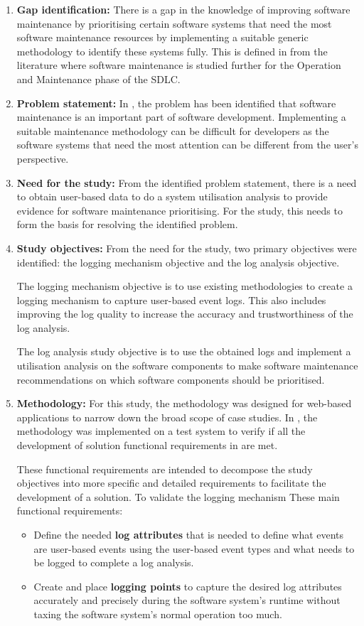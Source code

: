 \begin{enumerate}[label=\textbf{\Roman*.}]	
	\item \textbf{Gap identification:} There is a gap in the knowledge of improving software
	maintenance by prioritising certain software systems that need the most software maintenance
	resources by implementing a suitable generic methodology to identify these systems fully. This is defined in  from the literature where software maintenance is
	studied further for the Operation and Maintenance phase of the SDLC.
	\item \textbf{Problem statement:} In , the problem has been
	identified that software maintenance is an important part of software development. Implementing
	a suitable maintenance methodology can be difficult for developers as the software systems that
	need the most attention can be different from the user's perspective.  
	\item \textbf{Need for the study:} From the identified problem statement, there is a need to
	obtain user-based data to do a system utilisation analysis to provide evidence for software
	maintenance prioritising. For the study, this needs to form the basis for resolving the identified problem.
	\item \textbf{Study objectives:} From the need for the study, two primary objectives were
	identified: the logging mechanism objective and the log analysis objective.\par The logging
	mechanism objective is to use existing methodologies to create a logging mechanism to capture
	user-based event logs. This also includes improving the log quality to increase the accuracy and
	trustworthiness of the log analysis.\par The log analysis study objective is to use the obtained
	logs and implement a utilisation analysis on the software components to make software
	maintenance recommendations on which software components should be prioritised.
	\item \textbf{Methodology:} For this study, the methodology was designed for web-based
	applications to narrow down the broad scope of case studies. In , the methodology
	was implemented on a test system to verify if all the development of solution functional
	requirements in  are met.\par These functional
	requirements are intended to decompose the study objectives into more specific and detailed
	requirements to facilitate the development of a solution. To validate the logging mechanism
	These main functional requirements:
	 \begin{itemize}
		\item Define the needed \textbf{log attributes} that is needed to define what events are
		user-based events using the user-based event types and what needs to be logged to complete a
		log analysis.
		\item Create and place \textbf{logging points} to capture the desired log attributes
		accurately and precisely during the software system's runtime without taxing the software
		system's normal operation too much.
	 \end{itemize}


\end{enumerate}
